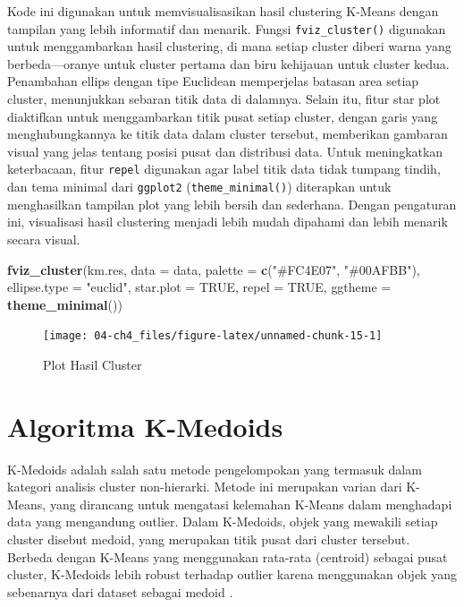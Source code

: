 \documentclass[
  oneside]{book}
\newenvironment{Shaded}{\begin{snugshade}}{\end{snugshade}}
\newcommand{\AttributeTok}[1]{\textcolor[rgb]{0.13,0.29,0.53}{#1}}
\newcommand{\ConstantTok}[1]{\textcolor[rgb]{0.56,0.35,0.01}{#1}}
\newcommand{\FunctionTok}[1]{\textcolor[rgb]{0.13,0.29,0.53}{\textbf{#1}}}
\newcommand{\NormalTok}[1]{#1}
\newcommand{\StringTok}[1]{\textcolor[rgb]{0.31,0.60,0.02}{#1}}
\begin{document}
Kode ini digunakan untuk memvisualisasikan hasil clustering K-Means dengan tampilan yang lebih informatif dan menarik. Fungsi \texttt{fviz\_cluster()} digunakan untuk menggambarkan hasil clustering, di mana setiap cluster diberi warna yang berbeda---oranye untuk cluster pertama dan biru kehijauan untuk cluster kedua. Penambahan ellips dengan tipe Euclidean memperjelas batasan area setiap cluster, menunjukkan sebaran titik data di dalamnya. Selain itu, fitur star plot diaktifkan untuk menggambarkan titik pusat setiap cluster, dengan garis yang menghubungkannya ke titik data dalam cluster tersebut, memberikan gambaran visual yang jelas tentang posisi pusat dan distribusi data. Untuk meningkatkan keterbacaan, fitur \texttt{repel} digunakan agar label titik data tidak tumpang tindih, dan tema minimal dari \texttt{ggplot2} (\texttt{theme\_minimal()}) diterapkan untuk menghasilkan tampilan plot yang lebih bersih dan sederhana. Dengan pengaturan ini, visualisasi hasil clustering menjadi lebih mudah dipahami dan lebih menarik secara visual.

\begin{Shaded}
\begin{Highlighting}[]
\FunctionTok{fviz\_cluster}\NormalTok{(km.res, }\AttributeTok{data =}\NormalTok{ data,}
             \AttributeTok{palette =} \FunctionTok{c}\NormalTok{(}\StringTok{"\#FC4E07"}\NormalTok{, }\StringTok{"\#00AFBB"}\NormalTok{),}
             \AttributeTok{ellipse.type =} \StringTok{"euclid"}\NormalTok{, }
             \AttributeTok{star.plot =} \ConstantTok{TRUE}\NormalTok{, }
             \AttributeTok{repel =} \ConstantTok{TRUE}\NormalTok{, }
             \AttributeTok{ggtheme =} \FunctionTok{theme\_minimal}\NormalTok{())}
\end{Highlighting}
\end{Shaded}

\begin{figure}[h]

{\centering \texttt{[image: 04-ch4\_files/figure-latex/unnamed-chunk-15-1]} 

}

\caption{Plot Hasil Cluster}\label{fig:unnamed-chunk-15}
\end{figure}

\chapter{Algoritma K-Medoids}\label{kmed}

K-Medoids adalah salah satu metode pengelompokan yang termasuk dalam kategori analisis cluster non-hierarki. Metode ini merupakan varian dari K-Means, yang dirancang untuk mengatasi kelemahan K-Means dalam menghadapi data yang mengandung outlier. Dalam K-Medoids, objek yang mewakili setiap cluster disebut medoid, yang merupakan titik pusat dari cluster tersebut. Berbeda dengan K-Means yang menggunakan rata-rata (centroid) sebagai pusat cluster, K-Medoids lebih robust terhadap outlier karena menggunakan objek yang sebenarnya dari dataset sebagai medoid \citep{jiawei2006data}.
\end{document}

